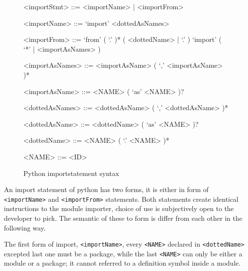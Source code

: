 
\begin{figure}[ht]
    \begin{framed}
        \begin{grammar}
            <importStmt>
            ::= <importName>
            | <importFrom>

            <importName>
            ::= `import' <dottedAsNames>

            <importFrom>
            ::= `from' ( `.' )* ( <dottedName> | `.' ) `import' ( `*' | <importAsNames> )

            <importAsNames>
            ::= <importAsName> ( `,' <importAsName> )*

            <importAsName>
            ::= <NAME> ( `as' <NAME> )?

            <dottedAsNames>
            ::= <dottedAsName> ( `,' <dottedAsName> )*

            <dottedAsName>
            ::= <dottedName> ( `as' <NAME> )?

            <dottedName>
            ::= <NAME> ( `.' <NAME> )*

            <NAME> ::= <ID>
        \end{grammar}
    \end{framed}
    \caption{Python importstatement syntax }
    \label{fig:python-import-stmt-syntax}
\end{figure}

An import statement of python has two forms, it is either in form of \texttt{<importName>} and \texttt{<importFrom>} statements. Both statements create identical instructions to the module importer, choice of use is subjectively open to the developer to pick. The semantic of these to form is differ from each other in the following way.

The first form of import, \texttt{<importName>}, every \texttt{<NAME>} declared in \texttt{<dottedName>} excepted last one must be a package, while the last \texttt{<NAME>} can only be either a module or a package; it cannot referred to a definition symbol inside a module.

